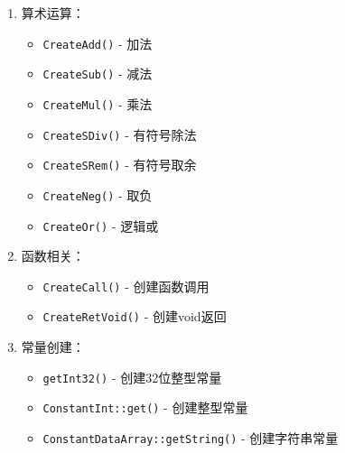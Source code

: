\documentclass[../main.tex]{subfiles}
\begin{document}
\begin{enumerate}
\begin{enumerate}
		      \item 算术运算：
		            \begin{itemize}
			            \item \texttt{CreateAdd()} - 加法
			            \item \texttt{CreateSub()} - 减法
			            \item \texttt{CreateMul()} - 乘法
			            \item \texttt{CreateSDiv()} - 有符号除法
			            \item \texttt{CreateSRem()} - 有符号取余
			            \item \texttt{CreateNeg()} - 取负
			            \item \texttt{CreateOr()} - 逻辑或
		            \end{itemize}

		      \item 函数相关：
		            \begin{itemize}
			            \item \texttt{CreateCall()} - 创建函数调用
			            \item \texttt{CreateRetVoid()} - 创建void返回
		            \end{itemize}

		      \item 常量创建：
		            \begin{itemize}
			            \item \texttt{getInt32()} - 创建32位整型常量
			            \item \texttt{ConstantInt::get()} - 创建整型常量
			            \item \texttt{ConstantDataArray::getString()} - 创建字符串常量
		            \end{itemize}


\end{enumerate}
\end{enumerate}
\end{document}
